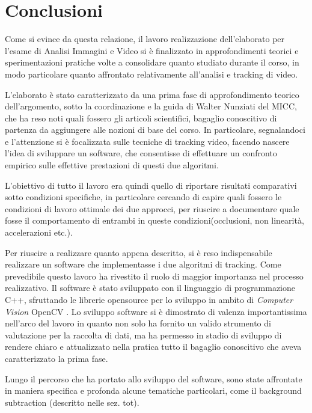 \section{Conclusioni}

Come si evince da questa relazione, il lavoro realizzazione dell'elaborato per l'esame di Analisi Immagini e Video si è finalizzato in approfondimenti teorici e sperimentazioni pratiche volte a consolidare quanto studiato durante il corso, in modo particolare quanto affrontato relativamente all'analisi e tracking di video. 

L'elaborato è stato caratterizzato da una prima fase di approfondimento teorico dell'argomento, sotto la coordinazione e la guida di Walter Nunziati del MICC, che ha reso noti quali fossero gli articoli scientifici, bagaglio conoscitivo di partenza da aggiungere alle nozioni di base del corso. In particolare, segnalandoci \cite{kalman-intro} e \cite{condensation} l'attenzione si è focalizzata sulle tecniche di tracking video, facendo nascere l'idea di sviluppare un software, che consentisse di effettuare un confronto empirico sulle effettive prestazioni di questi due algoritmi.

L'obiettivo di tutto il lavoro era quindi quello di riportare risultati comparativi sotto condizioni specifiche, in particolare cercando di capire quali fossero le condizioni di lavoro ottimale dei due approcci, per riuscire a documentare quale fosse il comportamento di entrambi in queste condizioni(occlusioni, non linearità, accelerazioni etc.).

Per riuscire a realizzare quanto appena descritto, si è reso indispensabile realizzare un software che implementasse i due algoritmi di tracking. Come prevedibile questo lavoro ha rivestito il ruolo di maggior importanza nel processo realizzativo. Il software è stato sviluppato con il linguaggio di programmazione C++, sfruttando le librerie opensource per lo sviluppo in ambito di \emph{Computer Vision} OpenCV \cite{opencv}. Lo sviluppo software si è dimostrato di valenza importantissima nell'arco del lavoro in quanto non solo ha fornito un valido strumento di valutazione per la raccolta di dati, ma ha permesso in stadio di sviluppo di rendere chiaro e attualizzato nella pratica tutto il bagaglio conoscitivo che aveva caratterizzato la prima fase.

Lungo il percorso che ha portato allo sviluppo del software, sono state affrontate in maniera specifica e profonda alcune tematiche particolari, come il background subtraction (descritto nelle sez. tot).

